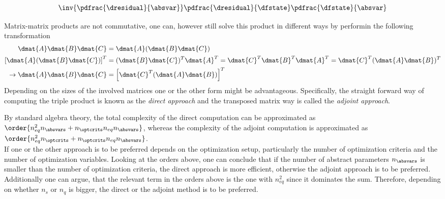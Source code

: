 \documentclass[../main.tex]{subfiles}
\begin{document}
\begin{align}
\inv{\pdfrac{\dresidual}{\absvar}} \pdfrac{\dresidual}{\dfstate}  \pdfrac{\dfstate}{\absvar}
\end{align}

 Matrix-matrix products are not commutative, one can, however still solve this product in different ways by performin the following transformation
\begin{align}\label{eq:adjoint_concept}
\dmat{A}\dmat{B}\dmat{C}                    &= \dmat{A}(\dmat{B}\dmat{C}) \nonumber\\
\left[ \dmat{A}(\dmat{B}\dmat{C}) \right]^T &= (\dmat{B}\dmat{C})^T\dmat{A}^T=\dmat{C}^T\dmat{B}^T\dmat{A}^T=\dmat{C}^T(\dmat{A}\dmat{B})^T \nonumber\\
\rightarrow \dmat{A}\dmat{B}\dmat{C}        &= \left[\dmat{C}^T(\dmat{A}\dmat{B})\right]^T
\end{align}
Depending on the sizes of the involved matrices one or the other form might be advantageous. Specifically, the straight forward way of computing the triple product is known as the \textit{direct approach} and the transposed matrix way is called the \textit{adjoint approach}.


By standard algebra theory, the total complexity of the direct computation can be approximated as $\order{n_{eq}^2n_{\absvars}+n_{\optcrits}n_{eq}n_{\absvars}}$, whereas the complexity of the adjoint computation is approximated as $\order{n_{eq}^2n_{\optcrits}+n_{\optcrits}n_{eq}n_{\absvars}}$.\\


If one or the other approach is to be preferred depends on the optimization setup, particularly the number of optimization criteria and the number of optimization variables. Looking at the orders above, one can conclude that if the number of abstract parameters $n_{\absvars}$ is smaller than the number of optimization criteria, the direct approach is more efficient, otherwise the adjoint approach is to be preferred. Additionally one can argue, that the relevant term in the orders above is the one with $n_{eq}^2$  since it dominates the sum. Therefore, depending on whether $n_s$ or $n_q$ is bigger, the direct or the adjoint method is to be preferred.
\end{document}
